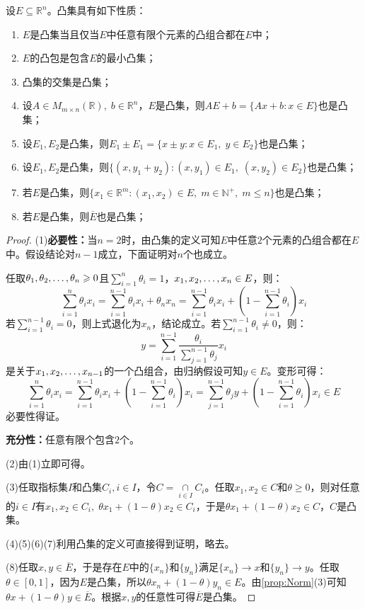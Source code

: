 \begin{property}\label{prop:ConvexSet}
	设$E\subseteq\mathbb{R}^{n}$。凸集具有如下性质：
	\begin{enumerate}
		\item $E$是凸集当且仅当$E$中任意有限个元素的凸组合都在$E$中；
		\item $E$的凸包是包含$E$的最小凸集；
		\item 凸集的交集是凸集；
		\item 设$A\in M_{m\times n}(\mathbb{R}),\;b\in\mathbb{R}^{n}$，$E$是凸集，则$AE+b=\{Ax+b:x\in E\}$也是凸集；
		\item 设$E_1,E_2$是凸集，则$E_1\pm E_1=\{x\pm y:x\in E_1,\;y\in E_2\}$也是凸集；
		\item 设$E_1,E_2$是凸集，则$\{(x,y_1+y_2):(x,y_1)\in E_1,\;(x,y_2)\in E_2\}$也是凸集；
		\item 若$E$是凸集，则$\{x_1\in\mathbb{R}^{m}:(x_1,x_2)\in E,\;m\in\mathbb{N}^+,\;m\leqslant n\}$也是凸集；
		\item 若$E$是凸集，则$\overline{E}$也是凸集；
	\end{enumerate}
\end{property}
\begin{proof}
	(1)\textbf{必要性：}当$n=2$时，由凸集的定义可知$E$中任意$2$个元素的凸组合都在$E$中。假设结论对$n-1$成立，下面证明对$n$个也成立。\par
	任取$\theta_1, \theta_2, \dots, \theta_{n}\geqslant0$且$\sum\limits_{i=1}^{n}\theta_i=1$，$x_1, x_2, \dots, x_{n}\in E$，则：
	\begin{equation*}
		\sum_{i=1}^{n}\theta_ix_i=\sum_{i=1}^{n-1}\theta_ix_i+\theta_nx_n=\sum_{i=1}^{n-1}\theta_ix_i+\left(1-\sum_{i=1}^{n-1}\theta_i\right)x_i
	\end{equation*}
	若$\sum\limits_{i=1}^{n-1}\theta_i=0$，则上式退化为$x_n$，结论成立。若$\sum\limits_{i=1}^{n-1}\theta_i\ne0$，则：
	\begin{equation*}
		y=\sum_{i=1}^{n-1}\frac{\theta_i}{\sum\limits_{j=1}^{n-1}\theta_j}x_i
	\end{equation*}
	是关于$x_1, x_2, \dots, x_{n-1}$的一个凸组合，由归纳假设可知$y\in E$。变形可得：
	\begin{equation*}
		\sum_{i=1}^{n}\theta_ix_i=\sum_{i=1}^{n-1}\theta_ix_i+\left(1-\sum_{i=1}^{n-1}\theta_i\right)x_i=\sum\limits_{j=1}^{n-1}\theta_jy+\left(1-\sum_{i=1}^{n-1}\theta_i\right)x_i\in E
	\end{equation*}
	必要性得证。\par
	\textbf{充分性：}任意有限个包含$2$个。\par
	(2)由(1)立即可得。\par
	(3)任取指标集$I$和凸集$C_i,i\in I$，令$C=\underset{i\in I}{\overset{}{\cap}}C_i$。任取$x_1,x_2\in C$和$\theta\geqslant0$，则对任意的$i\in I$有$x_1,x_2\in C_i,\;\theta x_1+(1-\theta)x_2\in C_i$，于是$\theta x_1+(1-\theta)x_2\in C$，$C$是凸集。\par
	(4)(5)(6)(7)利用凸集的定义可直接得到证明，略去。\par
	(8)任取$x,y\in\overline{E}$，于是存在$E$中的$\{x_n\}$和$\{y_n\}$满足$\{x_n\}\to x$和$\{y_n\}\to y$。任取$\theta\in[0,1]$，因为$E$是凸集，所以$\theta x_n+(1-\theta)y_n\in E$。由\cref{prop:Norm}(3)可知$\theta x+(1-\theta)y\in\overline{E}$。根据$x,y$的任意性可得$\overline{E}$是凸集。
\end{proof}
